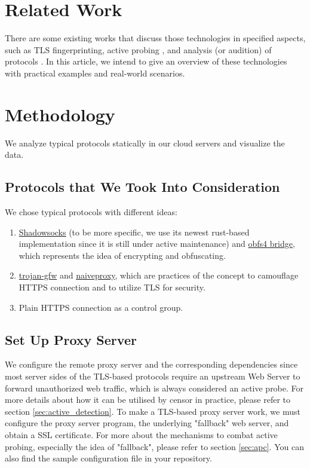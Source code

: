 \documentclass[conference]{IEEEtran}
\begin{document}
\section{Related Work}
There are some existing works that discuss those technologies in specified aspects, such as TLS fingerprinting\cite{TLS_Fingerprinting}, active probing \cite{Active_Probing}, and analysis (or audition) of protocols \cite{shadowsocks_analysis} \cite{Trojan_Probe}. In this article, we intend to give an overview of these technologies with practical examples and real-world scenarios.

\section{Methodology}
We analyze typical protocols statically in our cloud servers and visualize the data.

\subsection{Protocols that We Took Into Consideration}
We chose typical protocols with different ideas:
\begin{enumerate}
    \item \href{https://shadowsocks.org}{Shadowsocks} (to be more specific, we use its newest rust-based implementation since it is still under active maintenance) and \href{https://gitlab.com/yawning/obfs4}{obfs4 bridge}, which represents the idea of encrypting and obfuscating.
    \item \href{https://trojan-gfw.github.io/trojan/}{trojan-gfw} and \href{https://github.com/klzgrad/naiveproxy}{naiveproxy}, which are practices of the concept to camouflage HTTPS connection and to utilize TLS for security.
    \item Plain HTTPS connection as a control group.
\end{enumerate}

\subsection{Set Up Proxy Server}
We configure the remote proxy server and the corresponding dependencies since most server sides of the TLS-based protocols require an upstream Web Server to forward unauthorized web traffic, which is always considered an active probe. For more details about how it can be utilised by censor in practice, please refer to section \ref{sec:active_detection}.
To make a TLS-based proxy server work, we must configure the proxy server program, the underlying "fallback" web server, and obtain a SSL certificate. For more about the mechanisms to combat active probing, especially the idea of "fallback", please refer to section \ref{sec:apc}. You can also find the sample configuration file in your repository. %
\end{document}
